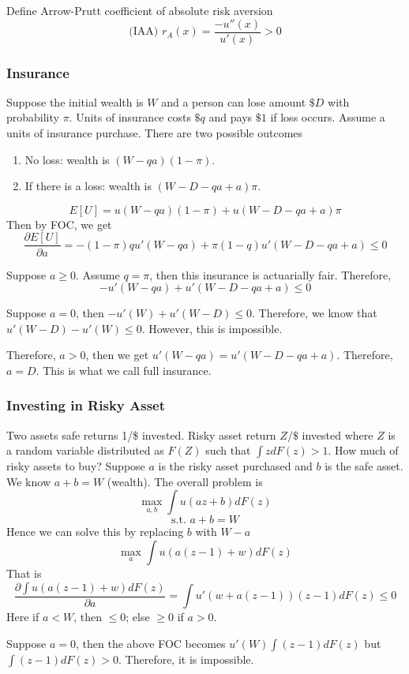 \documentclass[11pt, a4paper, oneside]{article}
\theoremstyle{definition}
\theoremstyle{proposition}
\theoremstyle{corollary}
\theoremstyle{lemma}
\theoremstyle{theorem}
\begin{document}
Define Arrow-Prutt coefficient of absolute risk aversion
$$\text{(IAA) }r_A(x) = \frac{-u''(x)}{u'(x)}>0$$

\subsubsection{Insurance}

Suppose the initial wealth is $W$ and a person can lose amount $\$D$ with probability $\pi$. Units of insurance costs $\$q$ and pays $\$1$ if loss occurs. Assume a units of insurance purchase. There are two possible outcomes
\begin{enumerate}
\item No loss: wealth is $(W-qa)(1-\pi)$. 
\item If there is a loss: wealth is $(W-D-qa+a)\pi$. 
\end{enumerate}

$$E[U] = u(W-qa)(1-\pi) +u(W-D-qa+a)\pi$$
Then by FOC, we get $$\frac{\partial E[U]}{\partial a} = -(1- \pi)qu'(W-qa)+\pi(1-q) u'(W-D-qa+a)\leq 0$$

Suppose $a\geq 0$. Assume $q = \pi$, then this insurance is actuarially fair. Therefore,
$$-u'(W-qa) + u'(W-D-qa + a) \leq 0$$

Suppose $a =0$, then $-u'(W) +u'(W-D) \leq 0$. Therefore, we know that $u'(W-D) - u'(W) \leq 0$. However, this is impossible. 

Therefore, $a> 0$, then we get $u'(W-qa) = u'(W- D-qa+a)$. Therefore, $a = D$. This is what we call full insurance. 

\subsubsection{Investing in Risky Asset}
Two assets safe returns 1/\$ invested. Risky asset return $Z/\$$ invested where $Z$ is a random variable distributed as $F(Z)$ such that $\int zdF(z) > 1$. How much of risky assets to buy? Suppose $a$ is the risky asset purchased and $b$ is the safe asset. We know $a+b = W$ (wealth). The overall problem is 
$$\max_{a, b}\int u(az+b)dF(z)$$
$$\text{s.t. } a + b = W$$
Hence we can solve this by replacing $b$ with $W- a$ 
$$\max_{a} \int u(a(z-1) + w ) dF(z)$$
That is
$$\frac{\partial  \int u(a(z-1) + w ) dF(z)}{\partial a} = \int u'(w+a(z-1))(z-1)dF(z) \leq 0$$ 
Here if $a < W$, then $\leq 0$; else $\geq 0$ if $a > 0$. 

Suppose $a=0$, then the above FOC becomes $u'(W)\int (z-1) dF(z)$ but $\int (z-1) dF(z) > 0$. Therefore, it is impossible. 
\end{document}
